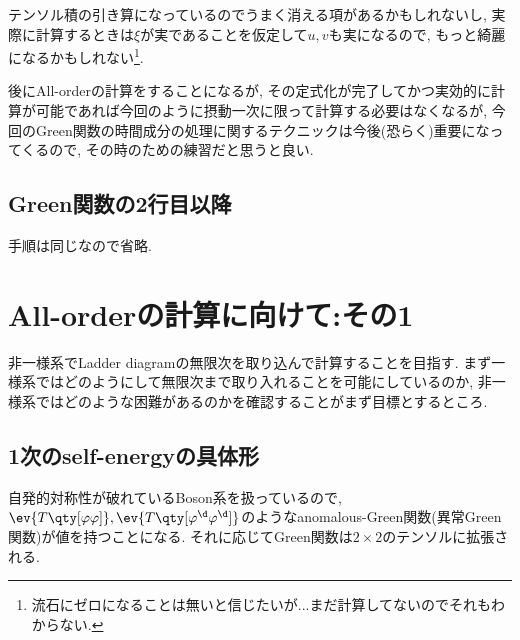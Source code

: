 \documentclass[10.5pt,a4paper]{jreport}
\begin{document}
テンソル積の引き算になっているのでうまく消える項があるかもしれないし, 実際に計算するときは$\xi$が実であることを仮定して$u, v$も実になるので, もっと綺麗になるかもしれない\footnote{流石にゼロになることは無いと信じたいが...まだ計算してないのでそれもわからない.}.

後にAll-orderの計算をすることになるが, その定式化が完了してかつ実効的に計算が可能であれば今回のように摂動一次に限って計算する必要はなくなるが, 今回のGreen関数の時間成分の処理に関するテクニックは今後(恐らく)重要になってくるので, その時のための練習だと思うと良い. 
\subsection{Green関数の2行目以降}
手順は同じなので省略. 
\section{All-orderの計算に向けて:その1}
非一様系でLadder diagramの無限次を取り込んで計算することを目指す. まず一様系ではどのようにして無限次まで取り入れることを可能にしているのか, 非一様系ではどのような困難があるのかを確認することがまず目標とするところ.
\subsection{1次のself-energyの具体形}
自発的対称性が破れているBoson系を扱っているので, $\ev{T\qty[\varphi\varphi]}, \ev{T\qty[\varphi^\d\varphi^\d]}$のようなanomalous-Green関数(異常Green関数)が値を持つことになる. それに応じてGreen関数は$2\times2$のテンソルに拡張される.
\end{document}
